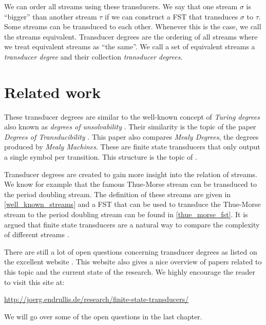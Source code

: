 We can order all streams using these transducers. We say that one stream $\sigma$ is ``bigger'' than another stream $\tau$ if we can construct a FST that transduces $\sigma$ to $\tau$. Some streams can be transduced to each other. Whenever this is the case, we call the streams equivalent. Transducer degrees are the ordering of all streams where we treat equivalent streams as ``the same''. We call a set of equivalent streams a \textit{transducer degree} and their collection \textit{transducer degrees}.
\vspace{1em}

\section*{Related work}

These transducer degrees are similar to the well-known concept of \textit{Turing degrees} also known as \textit{degrees of unsolvability} \cite{ENDERTON1977527, sasso_1975}. Their similarity is the topic of the paper \textit{Degrees of Transducibility} \cite{streams:degrees:transducibility:2015}. This paper also compares \textit{Mealy Degrees}, the degrees produced by \textit{Mealy Machines}. These are finite state transducers that only output a single symbol per transition. This structure is the topic of \cite{ITA_2008__42_3_451_0}. 
\vspace{1em}

Transducer degrees are created to gain more insight into the relation of streams. We know for example that the famous Thue-Morse stream can be transduced to the period doubling stream. The definition of these streams are given in \cref{well_known_streams} and a FST that can be used to transduce the Thue-Morse stream to the period doubling stream can be found in \cref{thue_morse_fst}. It is argued that finite state transducers are a natural way to compare the complexity of different streams \cite{streams:degrees:2011}.
\vspace{1em}

There are still a lot of open questions concerning transducer degrees as listed on the excellent website \cite{websiteofjeorg}. This website also gives a nice overview of papers related to this topic and the current state of the research. We highly encourage the reader to visit this site at:
\begin{center}
	\url{http://joerg.endrullis.de/research/finite-state-transducers/}
\end{center}
We will go over some of the open questions in the last chapter.
\vspace{1em}

